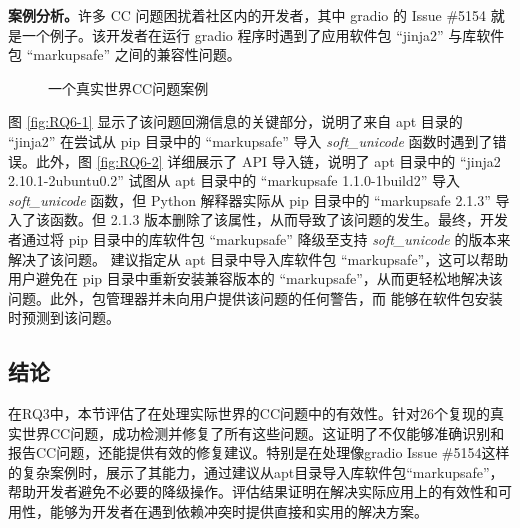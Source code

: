 \textbf{案例分析。}许多 CC 问题困扰着社区内的开发者，其中 gradio 的 Issue \#5154  就是一个例子。该开发者在运行 gradio 程序时遇到了应用软件包 “jinja2” 与库软件包 “markupsafe” 之间的兼容性问题。
\begin{figure}[t]
	\centering
	\hspace{4em}
	\caption{一个真实世界CC问题案例}
	\label{fig:RQ6}
\end{figure}
图 \ref{fig:RQ6-1}  显示了该问题回溯信息的关键部分，说明了来自 apt 目录的 “jinja2” 在尝试从 pip 目录中的 “markupsafe” 导入 \textit{soft\_unicode} 函数时遇到了错误。此外，图 \ref{fig:RQ6-2} 详细展示了 API 导入链，说明了 apt 目录中的 “jinja2 2.10.1-2ubuntu0.2” 试图从 apt 目录中的 “markupsafe 1.1.0-1build2” 导入 \textit{soft\_unicode} 函数，但 Python 解释器实际从 pip 目录中的 “markupsafe 2.1.3” 导入了该函数。但 2.1.3 版本删除了该属性，从而导致了该问题的发生。最终，开发者通过将 pip 目录中的库软件包 “markupsafe” 降级至支持 \textit{soft\_unicode} 的版本来解决了该问题。\tool{} 建议指定从 apt 目录中导入库软件包 “markupsafe”，这可以帮助用户避免在 pip 目录中重新安装兼容版本的 “markupsafe”，从而更轻松地解决该问题。此外，包管理器并未向用户提供该问题的任何警告，而 \tool{} 能够在软件包安装时预测到该问题。

\subsection{结论}
在RQ3中，本节评估了\tool{}在处理实际世界的CC问题中的有效性。针对26个复现的真实世界CC问题，\tool{}成功检测并修复了所有这些问题。这证明了\tool{}不仅能够准确识别和报告CC问题，还能提供有效的修复建议。特别是在处理像gradio Issue \#5154这样的复杂案例时，\tool{}展示了其能力，通过建议从apt目录导入库软件包“markupsafe”，帮助开发者避免不必要的降级操作。评估结果证明\tool{}在解决实际应用上的有效性和可用性，能够为开发者在遇到依赖冲突时提供直接和实用的解决方案。

